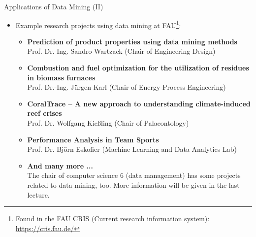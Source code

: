 \begin{frame}{Applications of Data Mining (II)}
	\begin{itemize}
		\item Example research projects using data mining at FAU\footnote{Found
			      in the FAU CRIS (Current research information system):
			      \url{https://cris.fau.de/}}:
		      \begin{itemize}
			      \item \textbf{Prediction of product properties using data mining
				            methods} \\
			            \small{Prof. Dr.-Ing. Sandro Wartzack (Chair of Engineering
				            Design)}
			      \item \textbf{Combustion and fuel optimization for the utilization
				            of residues in biomass furnaces} \\
			            \small{Prof. Dr.-Ing. Jürgen Karl (Chair of Energy Process
				            Engineering)}
			      \item \textbf{CoralTrace – A new approach to understanding
				            climate-induced reef crises} \\
			            \small{Prof. Dr. Wolfgang Kießling (Chair of Palaeontology)}
			      \item \textbf{Performance Analysis in Team Sports} \\
			            \small{Prof. Dr. Björn Eskofier (Machine Learning and Data
				            Analytics Lab)}
			      \item \textbf{And many more ...} \\
			            \small{The chair of computer science 6 (data management)
				            has some projects related to data mining, too. More
				            information will be given in the last lecture.}
		      \end{itemize}
	\end{itemize}
\end{frame}
